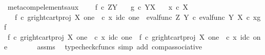 \begin{isabellebody}
\isanewline
%
\endisadelimproof
\isanewline
{}\isamarkupfalse%
\ meta{\isacharunderscore}{\kern0pt}comp{}{\isacharunderscore}{\kern0pt}elements{\isacharunderscore}{\kern0pt}aux{\isacharcolon}{\kern0pt}\ \isanewline
\ \ \ {\isachardoublequoteopen}f\ {\isasymin}\isactrlsub c\ Z\isactrlbsup Y\isactrlesup {\isachardoublequoteclose}\isanewline
\ \ \ {\isachardoublequoteopen}g\ {\isasymin}\isactrlsub c\ Y\isactrlbsup X\isactrlesup {\isachardoublequoteclose}\isanewline
\ \ \ {\isachardoublequoteopen}x\ {\isasymin}\isactrlsub c\ X{\isachardoublequoteclose}\isanewline
\ \ \ {\isachardoublequoteopen}{\isacharparenleft}{\kern0pt}f\isactrlsup {\isasymflat}\ {\isasymcirc}\isactrlsub c\ {\isasymlangle}g\isactrlsup {\isasymflat}{\isacharcomma}{\kern0pt}right{\isacharunderscore}{\kern0pt}cart{\isacharunderscore}{\kern0pt}proj\ X\ one{\isasymrangle}{\isacharparenright}{\kern0pt}\ \ {\isasymcirc}\isactrlsub c\ {\isasymlangle}x{\isacharcomma}{\kern0pt}\ id\isactrlsub c\ one{\isasymrangle}\ {\isacharequal}{\kern0pt}\ eval{\isacharunderscore}{\kern0pt}func\ Z\ Y\ {\isasymcirc}\isactrlsub c\ {\isasymlangle}eval{\isacharunderscore}{\kern0pt}func\ Y\ X\ {\isasymcirc}\isactrlsub c\ {\isasymlangle}x{\isacharcomma}{\kern0pt}g{\isasymrangle}{\isacharcomma}{\kern0pt}f{\isasymrangle}{\isachardoublequoteclose}\isanewline
%
\isadelimproof
%
\endisadelimproof
%
\isatagproof
{}\isamarkupfalse%
{\isacharminus}{\kern0pt}\isanewline
\ \ \ \ \isamarkupfalse%
\ {\isachardoublequoteopen}{\isacharparenleft}{\kern0pt}f\isactrlsup {\isasymflat}\ {\isasymcirc}\isactrlsub c\ {\isasymlangle}g\isactrlsup {\isasymflat}{\isacharcomma}{\kern0pt}right{\isacharunderscore}{\kern0pt}cart{\isacharunderscore}{\kern0pt}proj\ X\ one{\isasymrangle}{\isacharparenright}{\kern0pt}\ \ {\isasymcirc}\isactrlsub c\ {\isasymlangle}x{\isacharcomma}{\kern0pt}\ id\isactrlsub c\ one{\isasymrangle}{\isacharequal}{\kern0pt}\ \ f\isactrlsup {\isasymflat}\ {\isasymcirc}\isactrlsub c\ {\isasymlangle}g\isactrlsup {\isasymflat}{\isacharcomma}{\kern0pt}right{\isacharunderscore}{\kern0pt}cart{\isacharunderscore}{\kern0pt}proj\ X\ one{\isasymrangle}\ \ {\isasymcirc}\isactrlsub c\ {\isasymlangle}x{\isacharcomma}{\kern0pt}\ id\isactrlsub c\ one{\isasymrangle}{\isachardoublequoteclose}\isanewline
\ \ \ \ \ \ \isamarkupfalse%
\ assms\ \isamarkupfalse%
\ {\isacharparenleft}{\kern0pt}typecheck{\isacharunderscore}{\kern0pt}cfuncs{\isacharcomma}{\kern0pt}\ simp\ add{\isacharcolon}{\kern0pt}\ comp{\isacharunderscore}{\kern0pt}associative{}{\isacharparenright}{\kern0pt}\isanewline

\end{isabellebody}
